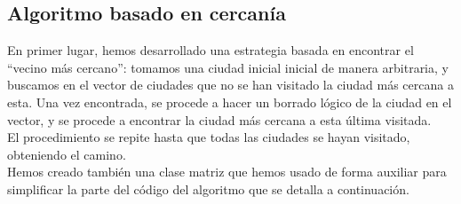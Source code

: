 \documentclass[11pt,a4paper]{article} %
\begin{document}
\subsection{Algoritmo basado en cercanía}

En primer lugar, hemos desarrollado una estrategia basada en encontrar el “vecino más cercano”: tomamos una ciudad inicial inicial de manera arbitraria, y buscamos en el vector de ciudades que no se han visitado la ciudad más cercana a esta. Una vez encontrada, se procede a hacer un borrado lógico de la ciudad en el vector, y se procede a encontrar la ciudad más cercana a esta última visitada.\\

El procedimiento se repite hasta que todas las ciudades se hayan visitado, obteniendo el camino.\\

Hemos creado también una clase matriz que hemos usado de forma auxiliar para simplificar la parte del código del algoritmo que se detalla a continuación.\\
\end{document}
